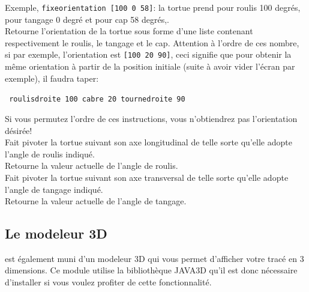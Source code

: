 Exemple, \texttt{fixeorientation [100 0 58]}: la tortue prend pour roulis 100 degrés, pour tangage 0 degré et pour cap 58 degrés,.\\
Retourne l'orientation de la tortue sous forme d'une liste contenant respectivement le roulis, le tangage et le cap. Attention à l'ordre de ces nombre, si par exemple, l'orientation est \texttt{[100 20 90]}, ceci signifie que pour obtenir la même orientation à partir de la position initiale (suite à avoir vider l'écran par exemple), il faudra taper:
\begin{center}
\texttt{ roulisdroite 100 cabre 20 tournedroite 90}
\end{center}
Si vous permutez l'ordre de ces instructions, vous n'obtiendrez pas l'orientation désirée!
\\
Fait pivoter la tortue suivant son axe longitudinal de telle sorte qu'elle adopte l'angle de roulis indiqué.\\
Retourne la valeur actuelle de l'angle de roulis.\\
Fait pivoter la tortue suivant son axe transversal de telle sorte qu'elle adopte l'angle de tangage indiqué.\\
Retourne la valeur actuelle de l'angle de tangage.\\
\subsection{Le modeleur 3D}
\xlogo est également muni d'un modeleur 3D qui vous permet d'afficher votre tracé en 3 dimensions. Ce module utilise la bibliothèque JAVA3D qu'il est donc nécessaire d'installer si vous voulez profiter de cette fonctionnalité. 


